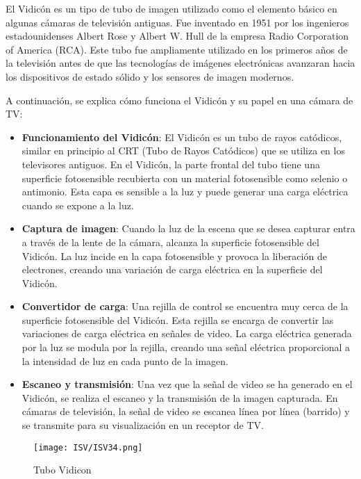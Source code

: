 \documentclass[
	12pt, %
	fleqn, %
	a4paper, %
	oneside, %
]{LegrandOrangeBook}
\begin{document}
El Vidicón es un tipo de tubo de imagen utilizado como el elemento básico en algunas cámaras de televisión antiguas. Fue inventado en 1951 por los ingenieros estadounidenses Albert Rose y Albert W. Hull de la empresa Radio Corporation of America (RCA). Este tubo fue ampliamente utilizado en los primeros años de la televisión antes de que las tecnologías de imágenes electrónicas avanzaran hacia los dispositivos de estado sólido y los sensores de imagen modernos.

A continuación, se explica cómo funciona el Vidicón y su papel en una cámara de TV:
\begin{itemize}
\item \textbf{Funcionamiento del Vidicón}: El Vidicón es un tubo de rayos catódicos, similar en principio al CRT (Tubo de Rayos Catódicos) que se utiliza en los televisores antiguos. En el Vidicón, la parte frontal del tubo tiene una superficie fotosensible recubierta con un material fotosensible como selenio o antimonio. Esta capa es sensible a la luz y puede generar una carga eléctrica cuando se expone a la luz.

\item \textbf{Captura de imagen}: Cuando la luz de la escena que se desea capturar entra a través de la lente de la cámara, alcanza la superficie fotosensible del Vidicón. La luz incide en la capa fotosensible y provoca la liberación de electrones, creando una variación de carga eléctrica en la superficie del Vidicón.

\item \textbf{Convertidor de carga}: Una rejilla de control se encuentra muy cerca de la superficie fotosensible del Vidicón. Esta rejilla se encarga de convertir las variaciones de carga eléctrica en señales de video. La carga eléctrica generada por la luz se modula por la rejilla, creando una señal eléctrica proporcional a la intensidad de luz en cada punto de la imagen.

\item \textbf{Escaneo y transmisión}: Una vez que la señal de video se ha generado en el Vidicón, se realiza el escaneo y la transmisión de la imagen capturada. En cámaras de televisión, la señal de video se escanea línea por línea (barrido) y se transmite para su visualización en un receptor de TV.
\end{itemize}
\begin{figure}[H]
\centering
\texttt{[image: ISV/ISV34.png]}
\caption{Tubo Vidicon}
\end{figure}
\end{document}
